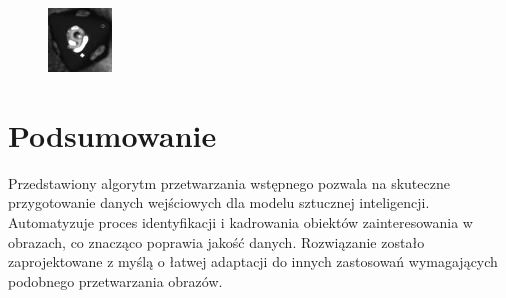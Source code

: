 \begin{figure}[H]
    \centering
    \includegraphics{chapters/04-czytanie/figures/blask_proc}
    \caption{}
    \label{fig:blaskproc}
\end{figure}



\section{Podsumowanie}

Przedstawiony algorytm przetwarzania wstępnego pozwala na skuteczne przygotowanie danych wejściowych dla modelu sztucznej inteligencji.
Automatyzuje proces identyfikacji i kadrowania obiektów zainteresowania w obrazach, co znacząco poprawia jakość danych.
Rozwiązanie zostało zaprojektowane z myślą o łatwej adaptacji do innych zastosowań wymagających podobnego przetwarzania obrazów.

